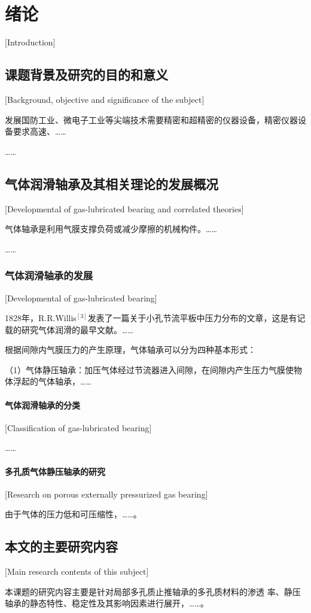 
\chapter{绪论}[Introduction]

\section{课题背景及研究的目的和意义}[Background, objective and significance of the subject]

发展国防工业、微电子工业等尖端技术需要精密和超精密的仪器设备，精密仪器设备要求高速、\dots\dots

\dots\dots

\section{气体润滑轴承及其相关理论的发展概况}[Developmental of gas-lubricated bearing and correlated theories]

气体轴承是利用气膜支撑负荷或减少摩擦的机械构件。\dots\dots

\dots\dots

\subsection{气体润滑轴承的发展}[Developmental of gas-lubricated bearing]

1828年，R.R.Willis$^{[3]}$发表了一篇关于小孔节流平板中压力分布的文章，这是有记载的研究气体润滑的最早文献。\dots\dots

根据间隙内气膜压力的产生原理，气体轴承可以分为四种基本形式：

（1）气体静压轴承：加压气体经过节流器进入间隙，在间隙内产生压力气膜使物体浮起的气体轴承，\dots\dots

\subsubsection{气体润滑轴承的分类}[Classification of gas-lubricated bearing]

\dots\dots

\subsubsection{多孔质气体静压轴承的研究}[Research on porous externally pressurized gas bearing]

由于气体的压力低和可压缩性，\dots\dots。

\section{本文的主要研究内容}[Main research contents of this subject]

本课题的研究内容主要是针对局部多孔质止推轴承的多孔质材料的渗透
率、静压轴承的静态特性、稳定性及其影响因素进行展开，\dots\dots。

